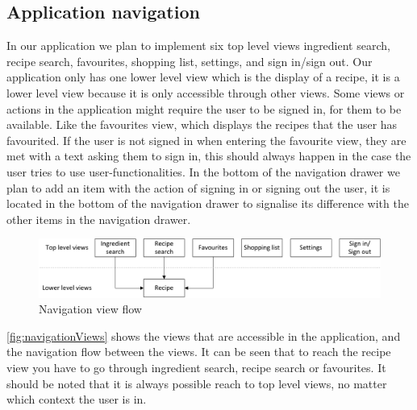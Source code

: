 \subsection{Application navigation}
In our application we plan to implement six top level views ingredient search, recipe search, favourites, shopping list, settings, and sign in/sign out. 
Our application only has one lower level view which is the display of a recipe, it is a lower level view because it is only accessible through other views.
Some views or actions in the application might require the user to be signed in, for them to be available. 
Like the favourites view, which displays the recipes that the user has favourited.
If the user is not signed in when entering the favourite view, they are met with a text asking them to sign in, this should always happen in the case the user tries to use user-functionalities. 
In the bottom of the navigation drawer we plan to add an item with the action of signing in or signing out the user, it is located in the bottom of the navigation drawer to signalise its difference with the other items in the navigation drawer.
\begin{figure}[H]
\centering
\includegraphics[width=1.0\linewidth]{img/navigation.pdf}
\caption{Navigation view flow}
\label{fig:navigationViews}
\end{figure}
\autoref{fig:navigationViews} shows the views that are accessible in the application, and the navigation flow between the views. 
It can be seen that to reach the recipe view you have to go through ingredient search, recipe search or favourites. It should be noted that it is always possible reach to top level views, no matter which context the user is in.
